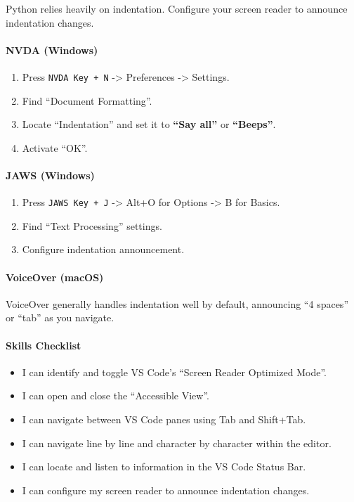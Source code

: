 \documentclass[
  justified,
  openright,
]{tufte-book}
\let\subsubsection\paragraph
\let\paragraph\paragraph
\let\subsubsection\paragraph
\let\paragraph\paragraph
\providecommand{\tightlist}{%
  \setlength{\itemsep}{0pt}\setlength{\parskip}{0pt}}
\begin{document}
Python relies heavily on indentation. Configure your screen reader to
announce indentation changes.

\paragraph{NVDA (Windows)}\label{nvda-windows}

\begin{enumerate}
\def\labelenumi{\arabic{enumi}.}
\tightlist
\item
  Press \texttt{NVDA\ Key\ +\ N} -\textgreater{} Preferences
  -\textgreater{} Settings.
\item
  Find ``Document Formatting''.
\item
  Locate ``Indentation'' and set it to \textbf{``Say all''} or
  \textbf{``Beeps''}.
\item
  Activate ``OK''.
\end{enumerate}

\paragraph{JAWS (Windows)}\label{jaws-windows}

\begin{enumerate}
\def\labelenumi{\arabic{enumi}.}
\tightlist
\item
  Press \texttt{JAWS\ Key\ +\ J} -\textgreater{} Alt+O for Options
  -\textgreater{} B for Basics.
\item
  Find ``Text Processing'' settings.
\item
  Configure indentation announcement.
\end{enumerate}

\paragraph{VoiceOver (macOS)}\label{voiceover-macos}

VoiceOver generally handles indentation well by default, announcing ``4
spaces'' or ``tab'' as you navigate.

\subsubsection{Skills Checklist}\label{skills-checklist-1}

\begin{itemize}
\tightlist
\item[$\square$]
  I can identify and toggle VS Code's ``Screen Reader Optimized Mode''.
\item[$\square$]
  I can open and close the ``Accessible View''.
\item[$\square$]
  I can navigate between VS Code panes using Tab and Shift+Tab.
\item[$\square$]
  I can navigate line by line and character by character within the
  editor.
\item[$\square$]
  I can locate and listen to information in the VS Code Status Bar.
\item[$\square$]
  I can configure my screen reader to announce indentation changes.
\end{itemize}
\end{document}
